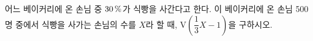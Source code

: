 어느 베이커리에 온 손님 중 $30\mkern3mu \%$가 식빵을 사간다고 한다. 이 베이커리에 온 손님 500명 중에서 식빵을 사가는 손님의 수를 $X$라 할 때, $\mathrm{V}\!\left(\dfrac{1}{3}X-1\right)$을 구하시오.
